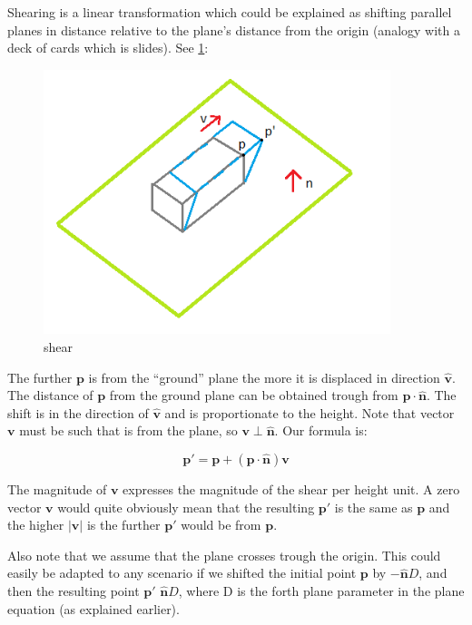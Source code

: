\documentclass[]{report}   %
\begin{document}
Shearing is a linear transformation which could be explained as shifting parallel planes in distance relative to the plane's distance from the origin (analogy with a deck of cards which is slides). See \ref{fig:shear}:
\begin{figure}[htb]
\centering
\includegraphics[width=0.9\textwidth]{shear-diagram}
\caption{shear}
\label{fig:shear}
\end{figure}

The further \(\mathbf{p}\) is from the ``ground'' plane the more it is displaced in direction \(\mathbf{\hat{v}}\). The distance of \(\mathbf{p}\) from the ground plane can be obtained trough from \(\mathbf{p} \cdot \mathbf{\hat{n}}\). The shift is in the direction of \(\mathbf{\hat{v}}\) and is proportionate to the height. Note that vector \(\mathbf{v}\) must be such that is from the plane, so \(\mathbf{v} \perp \mathbf{\hat{n}}\). Our formula is:
\begin{mdframed}
\[
	\mathbf{p\prime} = \mathbf{p} + (\mathbf{p} \cdot \mathbf{\hat{n}})\mathbf{v}
\]
\end{mdframed}

The magnitude of \(\mathbf{v}\) expresses the magnitude of the shear per height unit. A zero vector \(\mathbf{v}\) would quite obviously mean that the resulting \(\mathbf{p\prime}\) is the same as \(\mathbf{p}\) and the higher \(|\mathbf{v}|\) is the further \(\mathbf{p\prime}\) would be from \(\mathbf{p}\).

Also note that we assume that the plane crosses trough the origin. This could easily be adapted to any scenario if we shifted the initial point \(\mathbf{p}\) by \(-\mathbf{\hat{n}}D\), and then the resulting point \(\mathbf{p\prime}\) \(\mathbf{\hat{n}}D\), where D is the forth plane parameter in the plane equation (as explained earlier).
\end{document}
